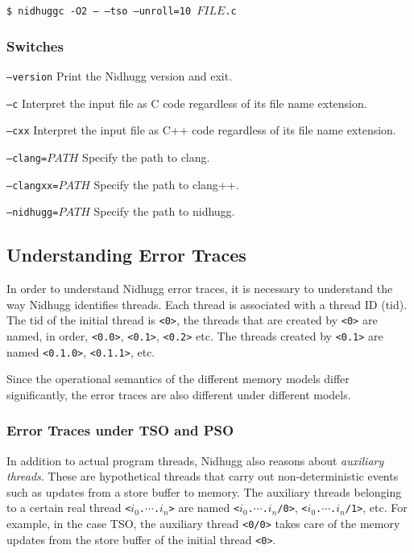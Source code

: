 \documentclass[a4paper]{article}
\begin{document}
\vspace{5pt}
\noindent
\texttt{\$ nidhuggc -O2 -- --tso --unroll=10 $FILE$.c}

\subsubsection{Switches}

\begin{description}
\item{\texttt{--version}}
%
  Print the Nidhugg version and exit.
\item{\texttt{--c}}
%
  Interpret the input file as C code regardless of its file name
  extension.
\item{\texttt{--cxx}}
%
  Interpret the input file as C++ code regardless of its file name
  extension.
\item{\texttt{--clang=$PATH$}}
%
  Specify the path to \textsf{clang}.
\item{\texttt{--clangxx=$PATH$}}
%
  Specify the path to \textsf{clang++}.
\item{\texttt{--nidhugg=$PATH$}}
%
  Specify the path to \textsf{nidhugg}.
\end{description}

\subsection{Understanding Error Traces}\label{sec:understand:error:traces}

In order to understand Nidhugg error traces, it is necessary to
understand the way Nidhugg identifies threads. Each thread is
associated with a thread ID (tid). The tid of the initial thread is
\texttt{<0>}, the threads that are created by \texttt{<0>} are named,
in order, \texttt{<0.0>}, \texttt{<0.1>}, \texttt{<0.2>} etc. The
threads created by \texttt{<0.1>} are named \texttt{<0.1.0>},
\texttt{<0.1.1>}, etc.

Since the operational semantics of the different memory models differ
significantly, the error traces are also different under different
models.

\subsubsection{Error Traces under TSO and PSO}

In addition to actual program threads, Nidhugg also reasons about
\emph{auxiliary threads}. These are hypothetical threads that carry
out non-deterministic events such as updates from a store buffer to
memory. The auxiliary threads belonging to a certain real thread
\texttt{<$i_0$.$\cdots$.$i_n$>} are named
\texttt{<$i_0$.$\cdots$.$i_n$/0>}, \texttt{<$i_0$.$\cdots$.$i_n$/1>},
etc. For example, in the case TSO, the auxiliary thread \texttt{<0/0>}
takes care of the memory updates from the store buffer of the initial
thread \texttt{<0>}.
\end{document}
